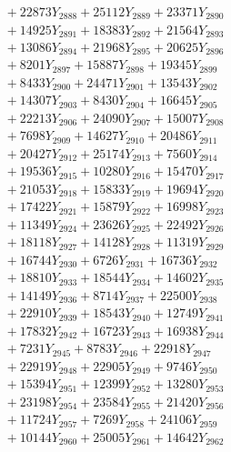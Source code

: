 \documentclass[a4paper,10pt]{article}
\begin{document}
{\begin{align}
&\;  + 22873 Y_{2888} + 25112 Y_{2889} + 23371 Y_{2890} \\[0.3ex]
&\;  + 14925 Y_{2891} + 18383 Y_{2892} + 21564 Y_{2893} \\[0.3ex]
&\;  + 13086 Y_{2894} + 21968 Y_{2895} + 20625 Y_{2896} \\[0.3ex]
&\;  + 8201 Y_{2897} + 15887 Y_{2898} + 19345 Y_{2899} \\[0.3ex]
&\;  + 8433 Y_{2900} + 24471 Y_{2901} + 13543 Y_{2902} \\[0.3ex]
&\;  + 14307 Y_{2903} + 8430 Y_{2904} + 16645 Y_{2905} \\[0.3ex]
&\;  + 22213 Y_{2906} + 24090 Y_{2907} + 15007 Y_{2908} \\[0.5ex]\allowbreak
&\;  + 7698 Y_{2909} + 14627 Y_{2910} + 20486 Y_{2911} \\[0.3ex]
&\;  + 20427 Y_{2912} + 25174 Y_{2913} + 7560 Y_{2914} \\[0.3ex]
&\;  + 19536 Y_{2915} + 10280 Y_{2916} + 15470 Y_{2917} \\[0.3ex]
&\;  + 21053 Y_{2918} + 15833 Y_{2919} + 19694 Y_{2920} \\[0.3ex]
&\;  + 17422 Y_{2921} + 15879 Y_{2922} + 16998 Y_{2923} \\[0.3ex]
&\;  + 11349 Y_{2924} + 23626 Y_{2925} + 22492 Y_{2926} \\[0.3ex]
&\;  + 18118 Y_{2927} + 14128 Y_{2928} + 11319 Y_{2929} \\[0.3ex]
&\;  + 16744 Y_{2930} + 6726 Y_{2931} + 16736 Y_{2932} \\[0.3ex]
&\;  + 18810 Y_{2933} + 18544 Y_{2934} + 14602 Y_{2935} \\[0.3ex]
&\;  + 14149 Y_{2936} + 8714 Y_{2937} + 22500 Y_{2938} \\[0.5ex]\allowbreak
&\;  + 22910 Y_{2939} + 18543 Y_{2940} + 12749 Y_{2941} \\[0.3ex]
&\;  + 17832 Y_{2942} + 16723 Y_{2943} + 16938 Y_{2944} \\[0.3ex]
&\;  + 7231 Y_{2945} + 8783 Y_{2946} + 22918 Y_{2947} \\[0.3ex]
&\;  + 22919 Y_{2948} + 22905 Y_{2949} + 9746 Y_{2950} \\[0.3ex]
&\;  + 15394 Y_{2951} + 12399 Y_{2952} + 13280 Y_{2953} \\[0.3ex]
&\;  + 23198 Y_{2954} + 23584 Y_{2955} + 21420 Y_{2956} \\[0.3ex]
&\;  + 11724 Y_{2957} + 7269 Y_{2958} + 24106 Y_{2959} \\[0.3ex]
&\;  + 10144 Y_{2960} + 25005 Y_{2961} + 14642 Y_{2962} \\[0.3ex]

\end{align}}
\end{document}

